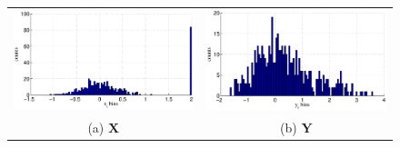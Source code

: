 \documentclass{article}[10pt]
\begin{document}
\begin{figure}[ht]
\begin{tabular}{cc}
\includegraphics[scale=0.5]{NoisyMultiResponseExample_Xhist.eps} & \includegraphics[scale=0.5]{NoisyMultiResponseExample_Yhist.eps} \\
(a) $\mathbf{X}$ & (b) $\mathbf{Y}$ \\

\end{tabular}
\end{figure}
\end{document}
